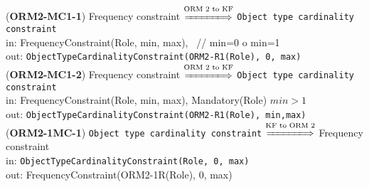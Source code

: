 \documentclass[sn-mathphys]{sn-jnl}
\begin{document}
{{{{%


({\bf ORM2-MC1-1}) {Frequency constraint}           $\overset{\text{ORM 2 to KF}}{\xLongrightarrow{\hspace*{1.4cm}}}$ {\tt Object type cardinality constraint}\\
\hspace*{0.3cm}in: {FrequencyConstraint(Role, min, max),\ } // min=0 o min=1\\
\hspace*{0.5cm}out:  {\tt ObjectTypeCardinalityConstraint(ORM2-R1(Role), 0, max)}\\


({\bf ORM2-MC1-2}) {Frequency constraint} $\overset{\text{ORM 2 to KF}}{\xLongrightarrow{\hspace*{1.4cm}}}$ {\tt Object type cardinality constraint}\\
\hspace*{0.3cm}in: {FrequencyConstraint(Role, min, max), Mandatory(Role)} \hfill $min>1$ \\ %
\hspace*{0.5cm}out: {\tt ObjectTypeCardinalityConstraint(ORM2-R1(Role), min,max)}\\ 

({\bf ORM2-1MC-1}) {\tt Object type cardinality constraint} $\overset{\text{KF to ORM 2}}{\xLongrightarrow{\hspace*{1.4cm}}}$ {Frequency constraint}\\
\hspace*{0.3cm}in: {\tt   ObjectTypeCardinalityConstraint(Role, 0, max)} \hfill \\
\hspace*{0.5cm}out:  {FrequencyConstraint(ORM2-1R(Role), 0, max)}\\

}}}}
\end{document}
